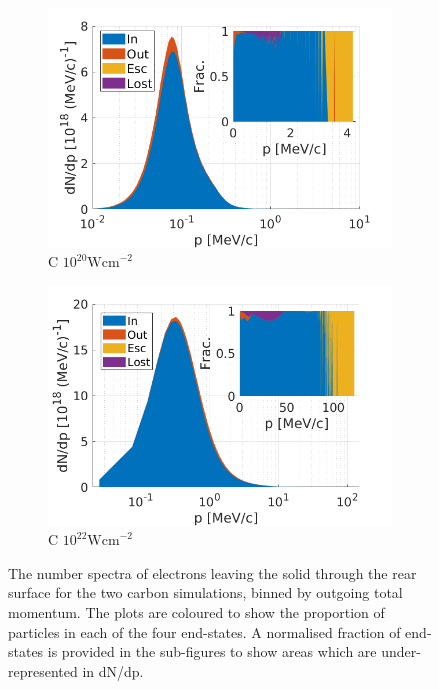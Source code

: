 \documentclass[12pt]{article}
\numberwithin{equation}{section}
\begin{document}
\begin{figure}
\centering
\begin{subfigure}{.49\textwidth}
  \centering
  \includegraphics[width=1\linewidth]{Figures/C_1e20_p_r.png}
  \caption{C $10^{20} \text{Wcm}^{-2}$}
\end{subfigure}%
\begin{subfigure}{.49\textwidth}
  \centering
  \includegraphics[width=1\linewidth]{Figures/C_1e22_p_r.png}
  \caption{C $10^{22} \text{Wcm}^{-2}$}
\end{subfigure}
\caption{The number spectra of electrons leaving the solid through the rear surface for the two carbon simulations, binned by outgoing total momentum. The plots are coloured to show the proportion of particles in each of the four end-states. A normalised fraction of end-states is provided in the sub-figures to show areas which are under-represented in dN/dp.}
\label{fig:tnsa_fate_p}
\end{figure}
\end{document}
